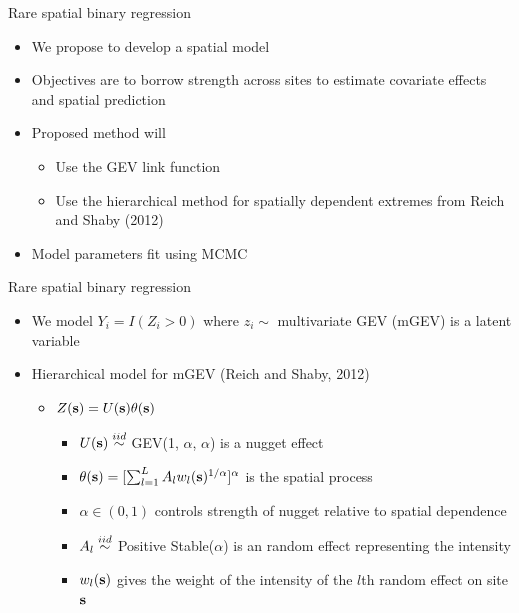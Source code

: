 \documentclass{beamer}
\begin{document}
\begin{frame}{Rare spatial binary regression}
  \begin{itemize} \setlength{\itemsep}{1em}
    \item We propose to develop a spatial model
    \item Objectives are to borrow strength across sites to estimate covariate effects and spatial prediction
    \item Proposed method will
    \begin{itemize}
      \item Use the GEV link function
      \item Use the hierarchical method for spatially dependent extremes from Reich and Shaby (2012)
    \end{itemize}
    \item Model parameters fit using MCMC
  \end{itemize}
\end{frame}

\begin{frame}{Rare spatial binary regression}
  \begin{itemize} \setlength{\itemsep}{1em}
    \item We model $Y_i = I(Z_i > 0)$ where $z_i\sim$ multivariate GEV (mGEV)  is a latent variable
    \item Hierarchical model for mGEV (Reich and Shaby, 2012)
    \begin{itemize}
      \item $Z(\mbox{\bf s}) = U(\mbox{\bf s}) \theta(\mbox{\bf s})$
      \begin{itemize}
        \item $U(\mbox{\bf s}) \stackrel{iid}{\sim}$ GEV(1, $\alpha$, $\alpha$) is a nugget effect
        \item $\theta(\mbox{\bf s}) = [\sum_{l = 1}^L A_l w_l(\mbox{\bf s})^{1/\alpha}]^\alpha$ is the spatial process
        \item $\alpha \in (0, 1)$ controls strength of nugget relative to spatial dependence
        \item $A_l \stackrel{iid}{\sim}$ Positive Stable($\alpha$) is an random effect representing the intensity
        \item $w_l(\mbox{\bf s})$ gives the weight of the intensity of the $l$th random effect on site $\mbox{\bf s}$
      \end{itemize}
    \end{itemize}
  \end{itemize}
\end{frame}
\end{document}
